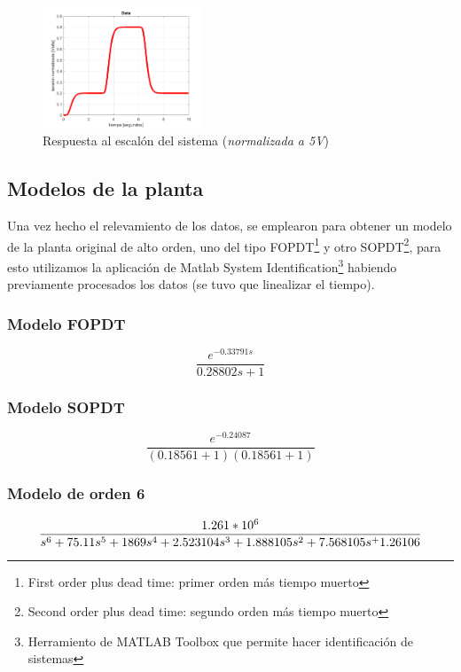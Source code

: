 \documentclass[letterpaper, 10 pt, conference]{ieeeconf}  %
\begin{document}
\begin{figure}[htpb]
  \centering
  \includegraphics[width=0.43\textwidth]{./imagenes/datos_resp_escalon.png}
  \caption{Respuesta al escalón del sistema (\textit{normalizada a 5V})}
  \label{fig:resp_esc}
\end{figure}

\subsection{Modelos de la planta}
Una vez hecho el relevamiento de los datos, se emplearon para obtener un modelo de la planta original de alto orden, uno del tipo FOPDT\footnote{First order plus dead time: primer orden más tiempo muerto} y otro SOPDT\footnote{Second order plus dead time: segundo orden más tiempo muerto}, para esto utilizamos la aplicación de Matlab System Identification\footnote{Herramiento de MATLAB Toolbox que permite hacer identificación de sistemas} habiendo previamente procesados los datos (se tuvo que linealizar el tiempo).

\subsubsection{Modelo FOPDT}
\begin{equation}
  \frac{e^{-0.33791s}}{0.28802s+1}
\end{equation}

\subsubsection{Modelo SOPDT}
\begin{equation}
  \frac{e^{-0.24087}}{(0.18561+1)(0.18561+1)}
\end{equation}

\subsubsection{Modelo de orden 6}
\begin{equation}
  \tiny{\frac{1.261*10^6}{s^6+75.11s^5+1869s^4+2.523104s^3+1.888105s^2+7.568105s^+1.26106}}
\end{equation}
\end{document}
